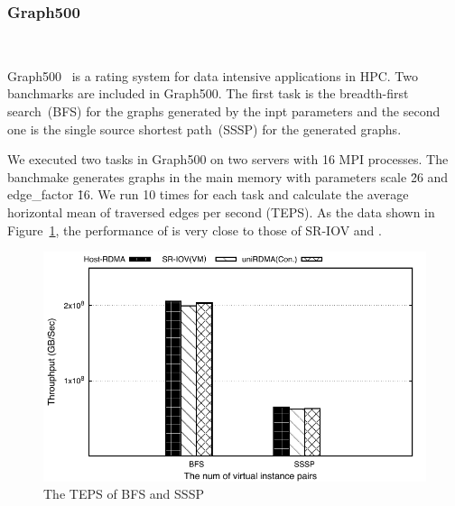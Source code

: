 \subsubsection{\textbf{Graph500}}
\
\noindent

Graph500~\cite{Graph500} is a rating system for data intensive applications in HPC. Two banchmarks are included in Graph500. The first task is the breadth-first search~(BFS) for the graphs generated by the inpt parameters and the second one is the single source shortest path~(SSSP) for the generated graphs. 

We executed two tasks in Graph500 on two servers with 16 MPI processes. The banchmake generates graphs in the main memory with parameters scale \= 26 and edge\_factor \= 16. We run 10 times for each task and calculate the average horizontal mean of traversed edges per second (TEPS). As the data shown in Figure~\ref{fig:graph500}, the performance of \sys is very close to those of SR-IOV and \native.

\begin{figure}[!ht]
	\centering
	\includegraphics[width=1.0\linewidth]{images/graph500.pdf}
	\caption{The TEPS of BFS and SSSP}
	\label{fig:graph500}
\end{figure}